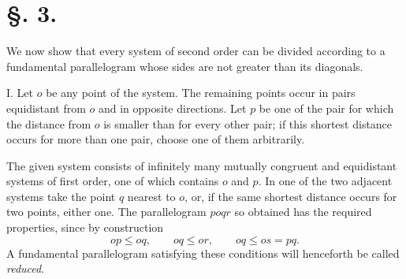 \documentclass[11pt]{article}
\begin{document}
\section*{§. 3.}

We now show that every system of second order can be divided according to a fundamental parallelogram whose sides are not greater than its diagonals.

I. Let $o$ be any point of the system. The remaining points occur in pairs equidistant from $o$ and in opposite directions. Let $p$ be one of the pair for which the distance from $o$ is smaller than for every other pair; if this shortest distance occurs for more than one pair, choose one of them arbitrarily.

The given system consists of infinitely many mutually congruent and equidistant systems of first order, one of which contains $o$ and $p$. In one of the two adjacent systems take the point $q$ nearest to $o$, or, if the same shortest distance occurs for two points, either one. The parallelogram $poqr$ so obtained has the required properties, since by construction
\[
 op\le oq,\qquad oq\le or,
\qquad oq\le os=pq.
\]
A fundamental parallelogram satisfying these conditions will henceforth be called \emph{reduced}.

\begin{center}
\end{center}
\end{document}
